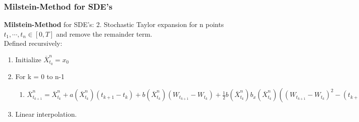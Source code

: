 \begin{frame}
\frametitle{Milstein-Method for SDE's}
\textbf{Milstein-Method} for SDE's: 2. Stochastic Taylor expansion for n points \(t_1,\cdots,t_n\in[0,T]\) and remove the remainder term.\\
Defined recursively:\\
\begin{enumerate}
\item Initialize \(\overline{X}^n_{t_0}=x_0\)
\item For k = 0 to n-1
\begin{enumerate}
\item \(\overline{X}^n_{t_{k+1}} = \overline{X}^n_{t_k} + a(\overline{X}^n_{t_k})(t_{k+1}-t_k) + b(\overline{X}^n_{t_k})(W_{t_{k+1}}-W_{t_k})
+ \frac{1}{2}b(\overline{X}^n_{t_k})b_x(\overline{X}^n_{t_k})((W_{t_{k+1}}-W_{t_k})^2-(t_{k+1}-t_k))\)
\end{enumerate}
\item Linear interpolation.
\end{enumerate}
\end{frame}


